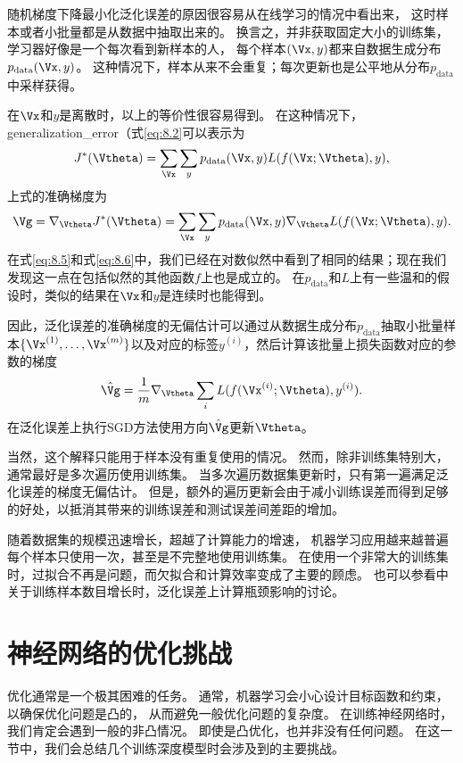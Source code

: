 随机梯度下降最小化泛化误差的原因很容易从在线学习的情况中看出来，
这时样本或者小批量都是从数据中抽取出来的。
换言之，并非获取固定大小的训练集，学习器好像是一个每次看到新样本的人，
每个样本$(\Vx,y)$都来自数据生成分布$p_{\text{data}}(\Vx,y)$。
这种情况下，样本从来不会重复；每次更新也是公平地从分布$p_\text{data}$中采样获得。

在$\Vx$和$y$是离散时，以上的等价性很容易得到。
在这种情况下，\gls{generalization_error}（式\ref{eq:8.2}可以表示为
\begin{equation}
\label{eq:8.7}
    J^*(\Vtheta) = \sum_{\Vx} \sum_y p_{\text{data}}(\Vx, y) L(f(\Vx; \Vtheta),y),
\end{equation}
上式的准确梯度为
\begin{equation}
\label{eq:8.8}
    \Vg = \nabla_{\Vtheta} J^*(\Vtheta) = \sum_{\Vx} \sum_y p_{\text{data}}
    (\Vx, y) \nabla_{\Vtheta} L(f(\Vx;\Vtheta),y) .
\end{equation}
在式\ref{eq:8.5}和式\ref{eq:8.6}中，我们已经在对数似然中看到了相同的结果；现在我们发现这一点在包括似然的其他函数$f$上也是成立的。
在$p_\text{data}$和$L$上有一些温和的假设时，类似的结果在$\Vx$和$y$是连续时也能得到。

因此，泛化误差的准确梯度的无偏估计可以通过从数据生成分布$p_\text{data}$抽取小批量样本$\{ \Vx^{(1)}, \dots,\Vx^{(m)} \}$以及对应的标签$y^{(i)}$，然后计算该批量上损失函数对应的参数的梯度
\begin{equation}
\label{eq:8.9}
    \hat{\Vg} = \frac{1}{m} \nabla_{\Vtheta} \sum_i L(f(\Vx^{(i)};\Vtheta),y^{(i)} ).
\end{equation}
在泛化误差上执行SGD方法使用方向$\hat{\Vg}$更新$\Vtheta$。

当然，这个解释只能用于样本没有重复使用的情况。
然而，除非训练集特别大，通常最好是多次遍历使用训练集。
当多次遍历数据集更新时，只有第一遍满足泛化误差的梯度无偏估计。
但是，额外的遍历更新会由于减小训练误差而得到足够的好处，以抵消其带来的训练误差和测试误差间差距的增加。


随着数据集的规模迅速增长，超越了计算能力的增速，
机器学习应用越来越普遍每个样本只使用一次，甚至是不完整地使用训练集。
在使用一个非常大的训练集时，过拟合不再是问题，而欠拟合和计算效率变成了主要的顾虑。
也可以参看\cite{bottou-bousquet-2008}中关于训练样本数目增长时，泛化误差上计算瓶颈影响的讨论。

\section{神经网络的优化挑战}
\label{sec:challenges_in_neural_network_optimization}
优化通常是一个极其困难的任务。
通常，机器学习会小心设计目标函数和约束，以确保优化问题是凸的，
从而避免一般优化问题的复杂度。
在训练神经网络时，我们肯定会遇到一般的非凸情况。
即使是凸优化，也并非没有任何问题。
在这一节中，我们会总结几个训练深度模型时会涉及到的主要挑战。


